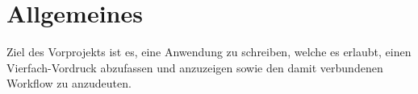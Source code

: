 \section{Allgemeines}
\label{sec:allgemeines}

  Ziel des Vorprojekts ist es, eine Anwendung zu schreiben, welche es erlaubt, einen Vierfach-Vordruck abzufassen und anzuzeigen sowie den damit verbundenen Workflow zu anzudeuten.
